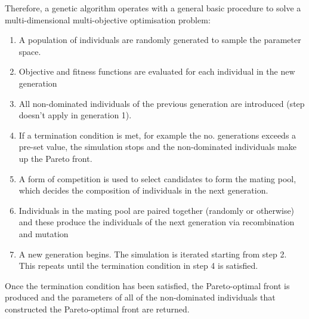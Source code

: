 \documentclass[../main.tex]{subfiles}
\begin{document}
Therefore, a genetic algorithm operates with a general basic procedure to solve a multi-dimensional multi-objective optimisation problem:
\begin{enumerate}
    \item{A population of individuals are randomly generated to sample the parameter space.}
    \item{Objective and fitness functions are evaluated for each individual in the new generation}
    \item{All non-dominated individuals of the previous generation are introduced (step doesn't apply in generation 1). }
    \item{If a termination condition is met, for example the no. generations exceeds a pre-set value, the simulation stops and the non-dominated individuals make up the Pareto front. }
    \item{A form of competition is used to select candidates to form the mating pool, which decides the composition of individuals in the next generation.}
    \item{Individuals in the mating pool are paired together (randomly or otherwise) and these produce the individuals of the next generation via recombination and mutation}
    \item{A new generation begins. The simulation is iterated starting from step 2. This repeats until the termination condition in step 4 is satisfied.}
\end{enumerate}
Once the termination condition has been satisfied, the Pareto-optimal front is produced and the parameters of all of the non-dominated individuals that constructed the Pareto-optimal front are returned. 
\end{document}
